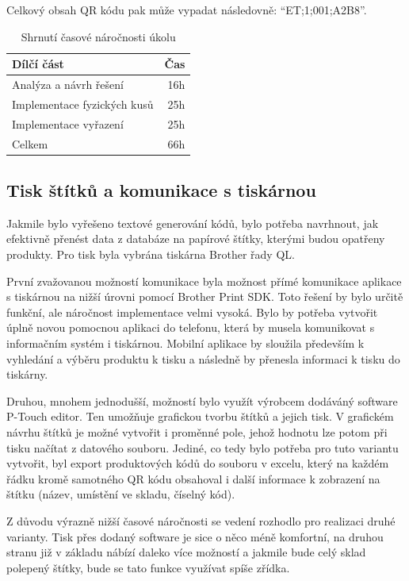 Celkový obsah QR kódu pak může vypadat následovně: \enquote{ET;1;001;A2B8}.


\begin{table}
	\centering
	\caption[Časová náročnost úkolu na evidenci fyzických kusů na skladě]{Shrnutí časové náročnosti úkolu}
	\label{tab:TopLevelTableLabel}
	{
		\begin{tabular}{lr}
			\toprule
			Dílčí část & Čas\\
			\midrule
			Analýza a návrh řešení & 16h \\
			Implementace fyzických kusů & 25h \\
            Implementace vyřazení & 25h \\
            \midrule
            Celkem  & 66h \\
			\midrule
		\end{tabular}
	}
\end{table}

\subsection{Tisk štítků a komunikace s tiskárnou}

Jakmile bylo vyřešeno textové generování kódů, bylo potřeba navrhnout, jak efektivně přenést data z databáze na papírové štítky, kterými budou opatřeny produkty. Pro tisk byla vybrána tiskárna Brother řady QL. 

První zvažovanou možností komunikace byla možnost přímé komunikace aplikace s tiskárnou na nižší úrovni pomocí Brother Print SDK. \cite{brotherInformationLabel} Toto řešení by bylo určitě funkční, ale náročnost implementace velmi vysoká. Bylo by potřeba vytvořit úplně novou pomocnou aplikaci do telefonu, která by musela komunikovat s informačním systém i tiskárnou. Mobilní aplikace by sloužila především k vyhledání a výběru produktu k tisku a následně by přenesla informaci k tisku do tiskárny.

Druhou, mnohem jednodušší, možností bylo využít výrobcem dodáváný software P-Touch editor. Ten umožňuje grafickou tvorbu štítků a jejich tisk. V grafickém návrhu štítků je možné vytvořit i proměnné pole, jehož hodnotu lze potom při tisku načítat z datového souboru.
Jediné, co tedy bylo potřeba pro tuto variantu vytvořit, byl export produktových kódů do souboru v excelu, který na každém řádku kromě samotného QR kódu obsahoval i další informace k zobrazení na štítku (název, umístění ve skladu, číselný kód).

Z důvodu výrazně nižší časové náročnosti se vedení rozhodlo pro realizaci druhé varianty. Tisk přes dodaný software je sice o něco méně komfortní, na druhou stranu již v základu nábízí daleko více možností a jakmile bude celý sklad polepený štítky, bude se tato funkce využívat spíše zřídka. 

